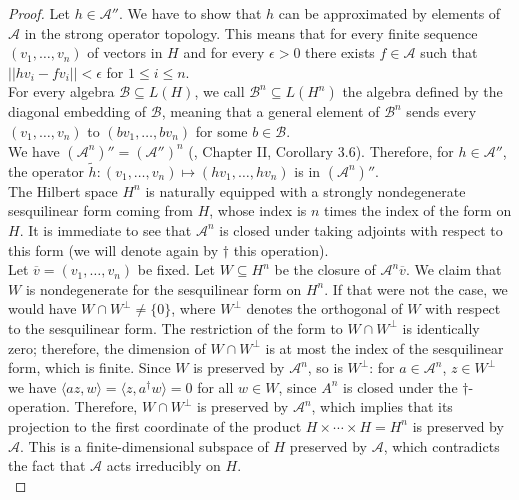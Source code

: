 \documentclass{article}
\theoremstyle{definition}
\theoremstyle{remark}
\theoremstyle{plain}
\begin{document}
\begin{proof}
    Let $h\in\mathcal{A}''$. We have to show that $h$ can be approximated by elements of $\mathcal{A}$ in the strong operator topology. This means that for every finite sequence $(v_1,\ldots,v_n)$ of vectors in $H$ and for every $\epsilon>0$ there exists $f\in\mathcal{A}$ such that $||hv_i-fv_i||<\epsilon$ for $1\leq i\leq n$. \\

    For every algebra $\mathcal{B}\subseteq L(H)$, we call $\mathcal{B}^n\subseteq L(H^n)$ the algebra defined by the diagonal embedding of $\mathcal{B}$, meaning that a general element of $\mathcal{B}^n$ sends every $(v_1,\ldots,v_n)$ to $(bv_1,\ldots,bv_n)$ for some $b\in\mathcal{B}$. \\
    
    We have $(\mathcal{A}^n)''=(\mathcal{A}'')^n$ (\cite{takesaki}, Chapter II, Corollary 3.6). Therefore, for $h\in\mathcal{A}''$, the operator $\widetilde{h}: (v_1,\ldots,v_n)\mapsto (hv_1,\ldots,hv_n)$ is in $(\mathcal{A}^n)''$. \\

    The Hilbert space $H^n$ is naturally equipped with a strongly nondegenerate sesquilinear form coming from $H$, whose index is $n$ times the index of the form on $H$. It is immediate to see that $\mathcal{A}^n$ is closed under taking adjoints with respect to this form (we will denote again by $\dag$ this operation). \\
    
     Let $\overline{v}=(v_1,\ldots,v_n)$ be fixed. Let $W\subseteq H^n$ be the closure of $\mathcal{A}^n\overline{v}$. We claim that $W$ is nondegenerate for the sesquilinear form on $H^n$. If that were not the case, we would have $W\cap W^\perp\neq\{0\}$, where $W^\perp$ denotes the orthogonal of $W$ with respect to the sesquilinear form. The restriction of the form to $W\cap W^\perp$ is identically zero; therefore, the dimension of $W\cap W^\perp$ is at most the index of the sesquilinear form, which is finite. Since $W$ is preserved by $\mathcal{A}^n$, so is $W^\perp$: for $a\in\mathcal{A}^n$, $z\in W^\perp$ we have $\langle az,w\rangle=\langle z,a^\dag w\rangle=0$ for all $w\in W$, since $A^n$ is closed under the $\dag$-operation. Therefore, $W\cap W^\perp$ is preserved by $\mathcal{A}^n$, which implies that its projection to the first coordinate of the product $H\times\cdots\times H=H^n$ is preserved by $\mathcal{A}$. This is a finite-dimensional subspace of $H$ preserved by $\mathcal{A}$, which contradicts the fact that $\mathcal{A}$ acts irreducibly on $H$. \\
     

\end{proof}
\end{document}
